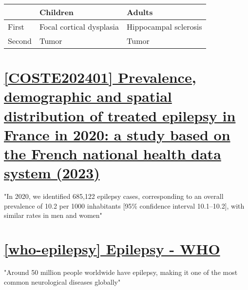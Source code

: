 \begin{tabular}{l|ll}
	& Children & Adults \\
	\hline
	First & Focal cortical dysplasia & Hippocampal sclerosis \\
	Second & Tumor & Tumor \\
\end{tabular}


\section{\href{https://link.springer.com/article/10.1007/s00415-023-11953-2?utm_source=getftr&utm_medium=getftr&utm_campaign=getftr_pilot&getft_integrator=sciencedirect_contenthosting}{[COSTE202401] Prevalence, demographic and spatial distribution of treated epilepsy in France in 2020: a study based on the French national health data system (2023) }}

"In 2020, we identified 685,122 epilepsy cases, corresponding to an overall prevalence of 10.2 per 1000 inhabitants [95\% confidence interval 10.1–10.2], with similar rates in men and women"

\section{\href{https://www.who.int/news-room/fact-sheets/detail/epilepsy/}{[who-epilepsy] Epilepsy - WHO}}

"Around 50 million people worldwide have epilepsy, making it one of the most common neurological diseases globally"
